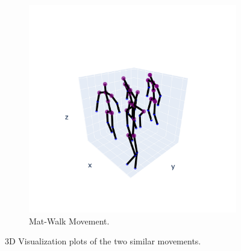 \begin{figure}[h]
\begin{subfigure}{.5\textwidth}
                  \includegraphics[width=1.\linewidth]{../src/resources/mov-plots/mov-8.png}
                  \caption{Mat-Walk Movement.}
                  \label{fig: mat-walk}
                \end{subfigure}
                \caption{3D Visualization plots of the two similar movements.}
            \end{figure}

\cleardoublepage